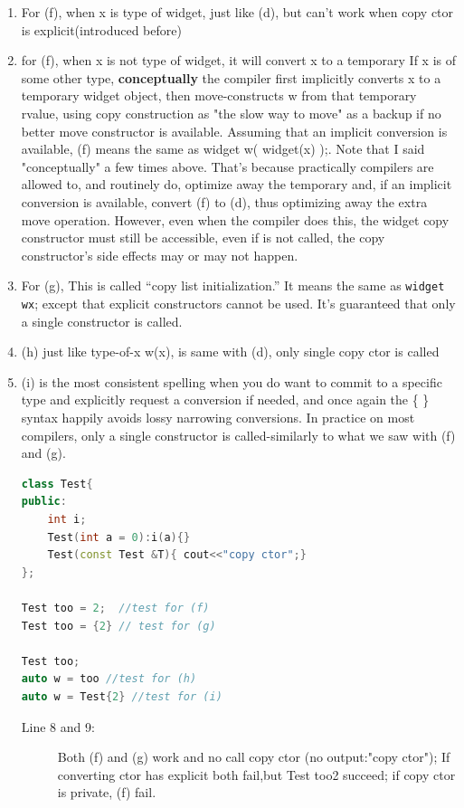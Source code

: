 \documentclass[a4paper,11pt,twoside]{book}
\begin{document}
\begin{itemize}
\begin{enumerate}
		\item For (f), when x is type of widget, just like (d), but can't work when copy ctor is explicit(introduced before)
		
		\item for (f), when x is not type of widget, it will convert x to a temporary If x is of some other type, \textbf{conceptually} the compiler first implicitly converts x to a temporary widget object, then move-constructs w from that temporary rvalue, using copy construction as "the slow way to move" as a backup if no better move constructor is available. Assuming that an implicit conversion is available, (f) means the same as widget w( widget(x) );. Note that I said "conceptually" a few times above. That's because practically compilers are allowed to, and routinely do, optimize away the temporary and, if an implicit conversion is available, convert (f) to (d), thus optimizing away the extra move operation. However, even when the compiler does this, the widget copy constructor must still be accessible, even if is not called, the copy constructor's side effects may or may not happen.

		\item For (g), This is called “copy list initialization.” It means the same as \texttt{widget w{x}}; except that explicit constructors cannot be used. It’s guaranteed that only a single constructor is called.
		
		\item (h) just like type-of-x w(x), is same with (d), only single copy ctor is called
		
		\item (i) is the most consistent spelling when you do want to commit to a specific type and explicitly request a conversion if needed, and once again the \{ \} syntax happily avoids lossy narrowing conversions. In practice on most compilers, only a single constructor is called-similarly to what we saw with (f) and (g).
		
\begin{lstlisting}[frame=single, language=c++,mathescape=true]
class Test{
public:
	int i;
	Test(int a = 0):i(a){}
	Test(const Test &T){ cout<<"copy ctor";} 
};
		
Test too = 2;  //test for (f) 
Test too = {2} // test for (g)
		
Test too;  
auto w = too //test for (h)
auto w = Test{2} //test for (i)
\end{lstlisting}
\begin{description}
	\item[Line 8 and 9:] Both (f) and (g) work and no call copy ctor (no output:"copy ctor"); If converting ctor has explicit both fail,but Test too{2} succeed; if copy ctor is private, (f) fail.


\end{description}
\end{enumerate}
\end{itemize}
\end{document}
